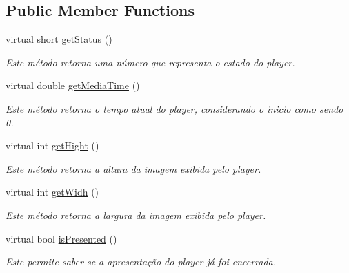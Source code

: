 \subsection*{Public Member Functions}
\begin{DoxyCompactItemize}
\item 
virtual short \hyperlink{classbr_1_1ufscar_1_1lince_1_1ginga_1_1wac_1_1state_1_1ElementaryState_a08806ab0fedbb9684ca5a0d1cb42c5ac}{getStatus} ()
\begin{DoxyCompactList}\small\item\em Este método retorna uma número que representa o estado do player. \item\end{DoxyCompactList}\item 
virtual double \hyperlink{classbr_1_1ufscar_1_1lince_1_1ginga_1_1wac_1_1state_1_1ElementaryState_a05bc58afddd1713b6300f383b7e26826}{getMediaTime} ()
\begin{DoxyCompactList}\small\item\em Este método retorna o tempo atual do player, considerando o inicio como sendo 0. \item\end{DoxyCompactList}\item 
virtual int \hyperlink{classbr_1_1ufscar_1_1lince_1_1ginga_1_1wac_1_1state_1_1ElementaryState_afe5f10172203bf1bc6064166658de738}{getHight} ()
\begin{DoxyCompactList}\small\item\em Este método retorna a altura da imagem exibida pelo player. \item\end{DoxyCompactList}\item 
virtual int \hyperlink{classbr_1_1ufscar_1_1lince_1_1ginga_1_1wac_1_1state_1_1ElementaryState_adf39d11c81458c2b636b797821a81fc3}{getWidh} ()
\begin{DoxyCompactList}\small\item\em Este método retorna a largura da imagem exibida pelo player. \item\end{DoxyCompactList}\item 
virtual bool \hyperlink{classbr_1_1ufscar_1_1lince_1_1ginga_1_1wac_1_1state_1_1ElementaryState_ab247813eed9444dfb53c59235b1f91a9}{isPresented} ()
\begin{DoxyCompactList}\small\item\em Este permite saber se a apresentação do player já foi encerrada. \item\end{DoxyCompactList}\item 

\end{DoxyCompactItemize}
